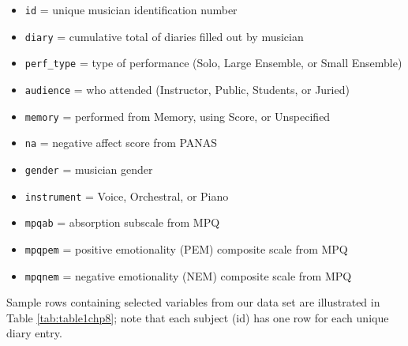 \documentclass[
]{krantz}
\providecommand{\tightlist}{%
  \setlength{\itemsep}{0pt}\setlength{\parskip}{0pt}}
\begin{document}
\begin{itemize}
\tightlist
\item
  \texttt{id} = unique musician identification number
\item
  \texttt{diary} = cumulative total of diaries filled out by musician
\item
  \texttt{perf\_type} = type of performance (Solo, Large Ensemble, or Small Ensemble)
\item
  \texttt{audience} = who attended (Instructor, Public, Students, or Juried)
\item
  \texttt{memory} = performed from Memory, using Score, or Unspecified
\item
  \texttt{na} = negative affect score from PANAS
\item
  \texttt{gender} = musician gender
\item
  \texttt{instrument} = Voice, Orchestral, or Piano
\item
  \texttt{mpqab} = absorption subscale from MPQ
\item
  \texttt{mpqpem} = positive emotionality (PEM) composite scale from MPQ
\item
  \texttt{mpqnem} = negative emotionality (NEM) composite scale from MPQ
\end{itemize}

Sample rows containing selected variables from our data set are illustrated in Table \ref{tab:table1chp8}; note that each subject (id) has one row for each unique diary entry.

\begin{table}
\centering
\caption{\label{tab:table1chp8}A snapshot of selected variables from the first three and the last three observations in the Music Performance Anxiety case study.}
\centering
{}
\end{table}
\end{document}

